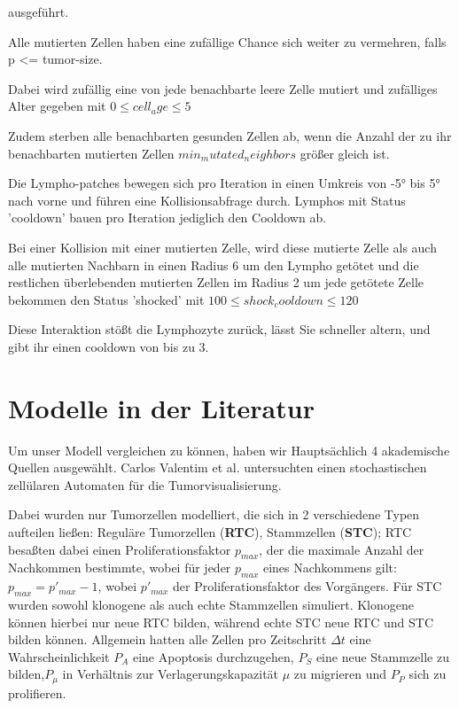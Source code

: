 \documentclass[conference]{IEEEtran}
\begin{document}
ausgeführt.

Alle mutierten Zellen haben eine zufällige Chance sich weiter zu vermehren, falls p <= tumor-size.

Dabei wird zufällig eine von jede benachbarte leere Zelle mutiert und zufälliges Alter gegeben mit \(0 \leq cell_age \leq 5\)

Zudem sterben alle benachbarten gesunden Zellen ab, wenn die Anzahl der zu ihr benachbarten mutierten Zellen \(min_mutated_neighbors\) größer gleich ist.

Die Lympho-patches bewegen sich pro Iteration in einen Umkreis von -5° bis 5° nach vorne und führen eine Kollisionsabfrage durch. Lymphos mit Status 'cooldown' bauen pro Iteration jediglich den Cooldown ab.

Bei einer Kollision mit einer mutierten Zelle, wird diese mutierte Zelle als auch alle mutierten Nachbarn in einen Radius 6 um den Lympho getötet und die restlichen überlebenden mutierten Zellen im Radius 2 um jede getötete Zelle bekommen den Status 'shocked' mit \(100 \leq shock_cooldown \leq 120\)

Diese Interaktion stößt die Lymphozyte zurück, lässt Sie schneller altern, und gibt ihr einen cooldown von bis zu 3.

\section{Modelle in der Literatur}

Um unser Modell vergleichen zu können, haben wir Hauptsächlich 4 akademische Quellen ausgewählt. 
\vspace{5mm}
Carlos Valentim et al. untersuchten einen stochastischen zellülaren Automaten für die Tumorvisualisierung. \cite{b1}


Dabei wurden nur Tumorzellen modelliert, die sich in 2 verschiedene Typen aufteilen ließen: Reguläre Tumorzellen (\textbf{RTC}), Stammzellen (\textbf{STC}); 
\vspace{5mm}
RTC besaßten dabei einen Proliferationsfaktor \(p_{max}\), der die maximale Anzahl der Nachkommen bestimmte, wobei für jeder \(p_{max}\) eines Nachkommens gilt: \(p_{max} = p'_{max} - 1\), wobei \(p'_{max}\) der Proliferationsfaktor des Vorgängers.
\vspace{5mm}
Für STC wurden sowohl klonogene als auch echte Stammzellen simuliert. Klonogene können hierbei nur neue RTC bilden, während echte STC neue RTC und STC bilden können.
\vspace{5mm}
Allgemein hatten alle Zellen pro Zeitschritt $\Delta t$ eine Wahrscheinlichkeit \(P_A\) eine Apoptosis durchzugehen, \(P_S\) eine neue Stammzelle zu bilden,\(P_\mu\) in Verhältnis zur Verlagerungskapazität $\mu$ zu migrieren und \(P_P\) sich zu prolifieren.
\end{document}
